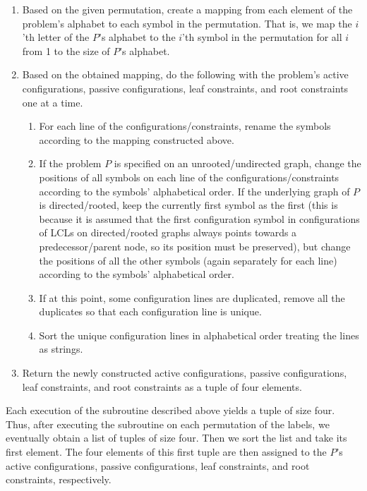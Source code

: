 \begin{enumerate}
  \item Based on the given permutation, create a mapping from each
  element of the problem's alphabet to each symbol in the permutation.
  That is, we map the $i$'th letter of the $P$'s alphabet to the $i$'th symbol
  in the permutation for all $i$ from 1 to the size of $P$'s alphabet.
  \item Based on the obtained mapping, do the following with the problem's
  active configurations, passive configurations, leaf constraints, and
  root constraints one at a time.
  
  \begin{enumerate}
    \item For each line of the configurations/constraints, rename the symbols
    according to the mapping constructed above.
    \item If the problem $P$ is specified on an unrooted/undirected graph,
    change the positions of all symbols on each line of the configurations/constraints according to the symbols' alphabetical order.
    If the underlying graph of $P$ is directed/rooted, keep the currently first
    symbol as the first (this is because it is assumed that the first configuration symbol in configurations of LCLs on directed/rooted graphs always points towards a predecessor/parent node, so its position must be preserved), but change the positions of all the other symbols (again separately for each line)
    according to the symbols' alphabetical order.
    \item If at this point, some configuration lines are
    duplicated, remove all the duplicates so that each configuration
    line is unique.
    \item Sort the unique configuration lines in alphabetical order
    treating the lines as strings.
  \end{enumerate}

  \item Return the newly constructed active configurations,
  passive configurations, leaf constraints, and root constraints as
  a tuple of four elements.
\end{enumerate}

Each execution of the subroutine described above yields a tuple
of size four. Thus, after executing the subroutine on each permutation of
the labels, we eventually obtain a list of tuples of size four.
Then we sort the list and take its first element. The four
elements of this first tuple are then assigned to the $P$'s
active configurations, passive configurations, leaf
constraints, and root constraints, respectively.

